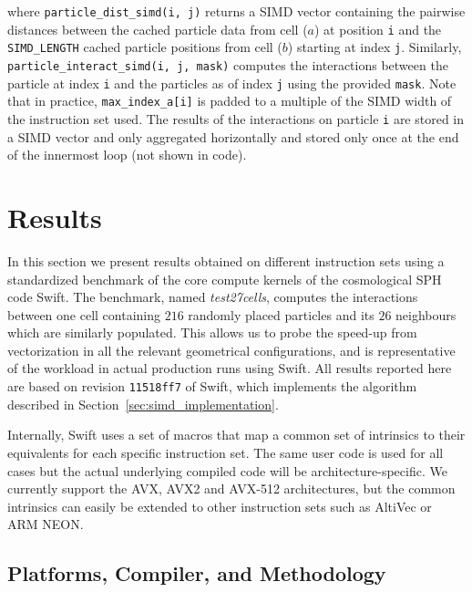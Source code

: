 \documentclass{IOS-Book-Article}
\newcommand{\swift}{{\sc Swift}\xspace}
\begin{document}
\noindent where {\tt particle\_dist\_simd(i, j)} returns a SIMD vector containing the pairwise distances between the cached particle data from cell ($a$) at position {\tt i} and the {\tt SIMD\_LENGTH} cached particle positions from cell ($b$) starting at index {\tt j}. Similarly, \texttt{particle\_interact\_simd(i, j, mask)} computes the interactions between the particle at index {\tt i} and the particles as of index {\tt j} using the provided {\tt mask}. Note that in practice, {\tt max\_index\_a[i]} is padded to a multiple of the SIMD width of the instruction set used. The results of the interactions on particle {\tt i} are stored in a SIMD vector and only aggregated horizontally and stored only once at the end of the innermost loop (not shown in code).~\\


\section{Results}

In this section we present results obtained on different instruction sets using a standardized benchmark of the core compute kernels of the cosmological SPH code \swift\cite{ref:SWIFT_PASC}. The benchmark, named {\em test27cells}, computes the interactions between one cell containing $216$ randomly placed particles and its $26$ neighbours which are similarly populated. This allows us to probe the speed-up from vectorization in all the relevant geometrical configurations, and is representative of the workload in actual production runs using \swift. All results reported here are based on revision \texttt{11518ff7} of \swift, which implements the algorithm described in Section~\ref{sec:simd_implementation}.

Internally, \swift uses a set of macros that map a common set of intrinsics to their equivalents for each specific instruction set. The same user code is used for all cases but the actual underlying compiled code will be architecture-specific. We currently support the AVX, AVX2 and AVX-512 architectures, but the common intrinsics can easily be extended to other instruction sets such as AltiVec or ARM NEON.

\subsection{Platforms, Compiler, and Methodology}
\end{document}
